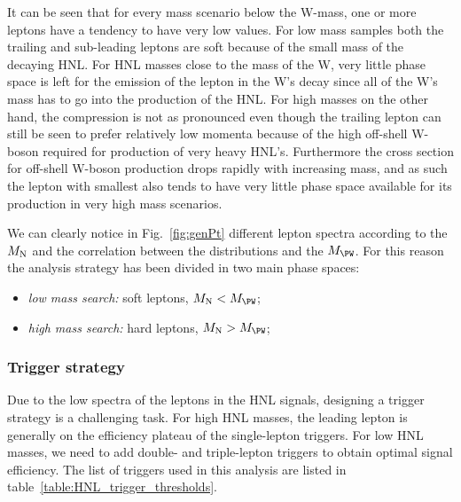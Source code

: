 It can be seen that for every mass scenario below the W-mass, one or
more leptons have a tendency to have very low \pt values. For low mass
samples both the trailing and sub-leading leptons are soft because of
the small mass of the decaying HNL. For HNL masses close to the mass of
the W, very little phase space is left for the emission of the lepton
in the W's decay since all of the W's mass has to go into the
production of the HNL. For high masses on the other hand, the
compression is not as pronounced even though the trailing lepton can
still be seen to prefer relatively low momenta because of the high off-shell W-boson required for production of very heavy
HNL's. Furthermore the cross section for off-shell W-boson production drops
rapidly with increasing mass, and as such the lepton with smallest \pt
also tends to have very little phase space available for its production in
very high mass scenarios.

We can clearly notice in Fig.~\ref{fig:genPt} different lepton \pt spectra according to the
$M_\mathrm{N}$ and the correlation between the distributions and the $M_\PW$. For this reason the analysis
strategy has been divided in two main phase spaces:
\begin{itemize}
\setlength\itemsep{-0.2em}
\item \emph{low mass search:} soft leptons, $M_\hnl < M_\PW$;
\item \emph{high mass search:} hard leptons, $M_\hnl > M_\PW$;
\end{itemize}

\subsubsection{Trigger strategy}
Due to the low \pt spectra of the leptons in the HNL signals, designing a trigger strategy is a challenging task. 
For high HNL masses, the leading lepton \pt is generally on the efficiency plateau of the single-lepton triggers.
For low HNL masses, we need to add double- and triple-lepton triggers to obtain optimal signal efficiency.
The list of triggers used in this analysis are listed in table~\ref{table:HNL_trigger_thresholds}.


